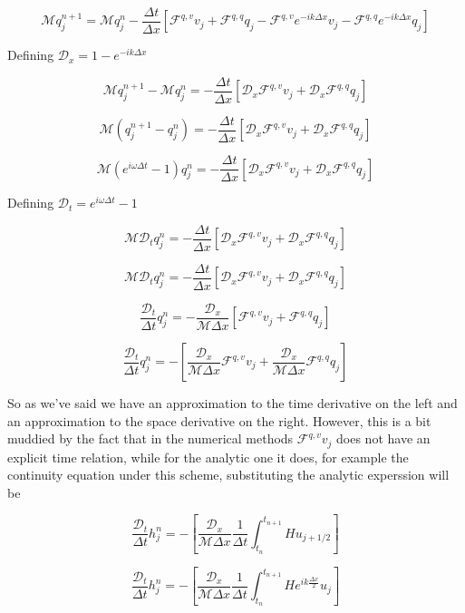 \documentclass[12pt]{article}
\begin{document}
\[\mathcal{M}q_j^{n+1} = \mathcal{M}q_j^{n} - \frac{\Delta t}{\Delta x} \left[\mathcal{F}^{q,v}v_{j} + \mathcal{F}^{q,q}q_{j} - \mathcal{F}^{q,v}e^{-ik\Delta x}v_{j} - \mathcal{F}^{q,q}e^{-ik\Delta x}q_{j} \right] \]

Defining $\mathcal{D}_x = 1 - e^{-ik\Delta x} $

\[\mathcal{M}q_j^{n+1} - \mathcal{M}q_j^{n}  = - \frac{\Delta t}{\Delta x} \left[ \mathcal{D}_x\mathcal{F}^{q,v}v_{j} + \mathcal{D}_x\mathcal{F}^{q,q}q_{j}\right] \]

\[\mathcal{M} \left(q_j^{n+1} - q_j^{n}\right)  = - \frac{\Delta t}{\Delta x} \left[ \mathcal{D}_x\mathcal{F}^{q,v}v_{j} + \mathcal{D}_x\mathcal{F}^{q,q}q_{j}\right] \]

\[\mathcal{M} \left(e^{i\omega \Delta t} - 1\right) q_j^{n} = - \frac{\Delta t}{\Delta x} \left[ \mathcal{D}_x\mathcal{F}^{q,v}v_{j} + \mathcal{D}_x\mathcal{F}^{q,q}q_{j}\right] \]

Defining $\mathcal{D}_t = e^{i\omega \Delta t} - 1$

\[\mathcal{M} \mathcal{D}_t q_j^{n} = - \frac{\Delta t}{\Delta x} \left[ \mathcal{D}_x\mathcal{F}^{q,v}v_{j} + \mathcal{D}_x\mathcal{F}^{q,q}q_{j}\right] \]

\[\mathcal{M} \mathcal{D}_t q_j^{n} = - \frac{\Delta t}{\Delta x} \left[ \mathcal{D}_x\mathcal{F}^{q,v}v_{j} + \mathcal{D}_x\mathcal{F}^{q,q}q_{j}\right] \]

\[\frac{\mathcal{D}_t}{\Delta t} q_j^{n} = - \frac{\mathcal{D}_x}{ \mathcal{M} \Delta x} \left[ \mathcal{F}^{q,v}v_{j} + \mathcal{F}^{q,q}q_{j}\right] \]

\[\frac{\mathcal{D}_t}{\Delta t} q_j^{n} = -\left[\frac{\mathcal{D}_x}{ \mathcal{M} \Delta x}\mathcal{F}^{q,v}v_{j} +  \frac{\mathcal{D}_x}{ \mathcal{M} \Delta x}\mathcal{F}^{q,q}q_{j}\right]\]

So as we've said we have an approximation to the time derivative on the left and an approximation to the space derivative on the right. However, this is a bit muddied by the fact that in the numerical methods $\mathcal{F}^{q,v}v_{j} $ does not have an explicit time relation, while for the analytic one it does, for example the continuity equation under this scheme, substituting the analytic experssion will be 

\[\frac{\mathcal{D}_t}{\Delta t} h_j^{n} = -\left[\frac{\mathcal{D}_x}{ \mathcal{M} \Delta x} \frac{1}{\Delta t}\int_{t_{n}}^{t_{n+1}}Hu_{j + 1/2} \right]\]

\[\frac{\mathcal{D}_t}{\Delta t} h_j^{n} = -\left[\frac{\mathcal{D}_x}{ \mathcal{M} \Delta x} \frac{1}{\Delta t}\int_{t_{n}}^{t_{n+1}}He^{ik \frac{\Delta x}{2}}u_{j} \right]\]
\end{document}
